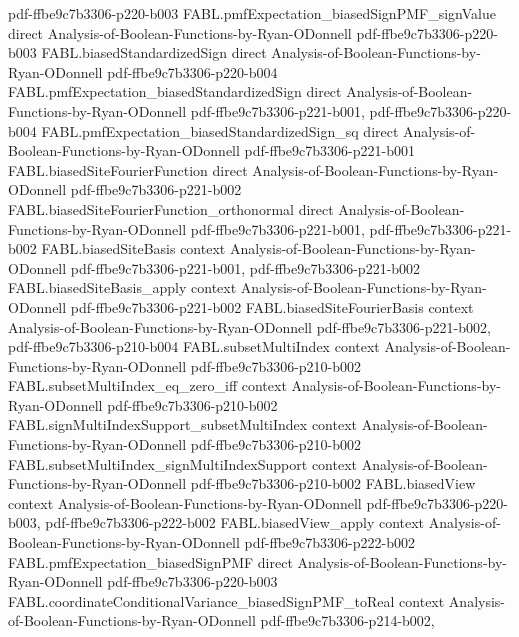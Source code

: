 \begin{theorem}
  {pdf-ffbe9c7b3306-p220-b003}
\proofstep
  {FABL.pmfExpectation_biasedSignPMF_signValue}
  {direct}
  {Analysis-of-Boolean-Functions-by-Ryan-ODonnell}
  {pdf-ffbe9c7b3306-p220-b003}
\proofstep
  {FABL.biasedStandardizedSign}
  {direct}
  {Analysis-of-Boolean-Functions-by-Ryan-ODonnell}
  {pdf-ffbe9c7b3306-p220-b004}
\proofstep
  {FABL.pmfExpectation_biasedStandardizedSign}
  {direct}
  {Analysis-of-Boolean-Functions-by-Ryan-ODonnell}
  {pdf-ffbe9c7b3306-p221-b001,
    pdf-ffbe9c7b3306-p220-b004}
\proofstep
  {FABL.pmfExpectation_biasedStandardizedSign_sq}
  {direct}
  {Analysis-of-Boolean-Functions-by-Ryan-ODonnell}
  {pdf-ffbe9c7b3306-p221-b001}
\proofstep
  {FABL.biasedSiteFourierFunction}
  {direct}
  {Analysis-of-Boolean-Functions-by-Ryan-ODonnell}
  {pdf-ffbe9c7b3306-p221-b002}
\proofstep
  {FABL.biasedSiteFourierFunction_orthonormal}
  {direct}
  {Analysis-of-Boolean-Functions-by-Ryan-ODonnell}
  {pdf-ffbe9c7b3306-p221-b001,
    pdf-ffbe9c7b3306-p221-b002}
\proofstep
  {FABL.biasedSiteBasis}
  {context}
  {Analysis-of-Boolean-Functions-by-Ryan-ODonnell}
  {pdf-ffbe9c7b3306-p221-b001,
    pdf-ffbe9c7b3306-p221-b002}
\proofstep
  {FABL.biasedSiteBasis_apply}
  {context}
  {Analysis-of-Boolean-Functions-by-Ryan-ODonnell}
  {pdf-ffbe9c7b3306-p221-b002}
\proofstep
  {FABL.biasedSiteFourierBasis}
  {context}
  {Analysis-of-Boolean-Functions-by-Ryan-ODonnell}
  {pdf-ffbe9c7b3306-p221-b002,
    pdf-ffbe9c7b3306-p210-b004}
\proofstep
  {FABL.subsetMultiIndex}
  {context}
  {Analysis-of-Boolean-Functions-by-Ryan-ODonnell}
  {pdf-ffbe9c7b3306-p210-b002}
\proofstep
  {FABL.subsetMultiIndex_eq_zero_iff}
  {context}
  {Analysis-of-Boolean-Functions-by-Ryan-ODonnell}
  {pdf-ffbe9c7b3306-p210-b002}
\proofstep
  {FABL.signMultiIndexSupport_subsetMultiIndex}
  {context}
  {Analysis-of-Boolean-Functions-by-Ryan-ODonnell}
  {pdf-ffbe9c7b3306-p210-b002}
\proofstep
  {FABL.subsetMultiIndex_signMultiIndexSupport}
  {context}
  {Analysis-of-Boolean-Functions-by-Ryan-ODonnell}
  {pdf-ffbe9c7b3306-p210-b002}
\proofstep
  {FABL.biasedView}
  {context}
  {Analysis-of-Boolean-Functions-by-Ryan-ODonnell}
  {pdf-ffbe9c7b3306-p220-b003,
    pdf-ffbe9c7b3306-p222-b002}
\proofstep
  {FABL.biasedView_apply}
  {context}
  {Analysis-of-Boolean-Functions-by-Ryan-ODonnell}
  {pdf-ffbe9c7b3306-p222-b002}
\proofstep
  {FABL.pmfExpectation_biasedSignPMF}
  {direct}
  {Analysis-of-Boolean-Functions-by-Ryan-ODonnell}
  {pdf-ffbe9c7b3306-p220-b003}
\proofstep
  {FABL.coordinateConditionalVariance_biasedSignPMF_toReal}
  {context}
  {Analysis-of-Boolean-Functions-by-Ryan-ODonnell}
  {pdf-ffbe9c7b3306-p214-b002,
}
\end{theorem}
